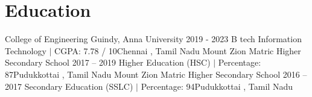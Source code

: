 \section{Education}
    \resumeSubHeadingListStart

    \resumeSubheading
    {College of Engineering Guindy, Anna University} {2019 - 2023}
    {B tech Information Technology $|$ CGPA: 7.78 / 10}{Chennai , Tamil Nadu}
    \vspace{5pt}
    \resumeSubheading
    {Mount Zion Matric Higher Secondary School} {2017 – 2019}
    {Higher Education (HSC) $|$ Percentage: 87}{Pudukkottai , Tamil Nadu}
    \vspace{5pt}
    \resumeSubheading
    {Mount Zion Matric Higher Secondary School} {2016 – 2017}
    {Secondary Education (SSLC) $|$ Percentage: 94}{Pudukkottai , Tamil Nadu}
    \vspace{5pt}
    \resumeSubHeadingListEnd